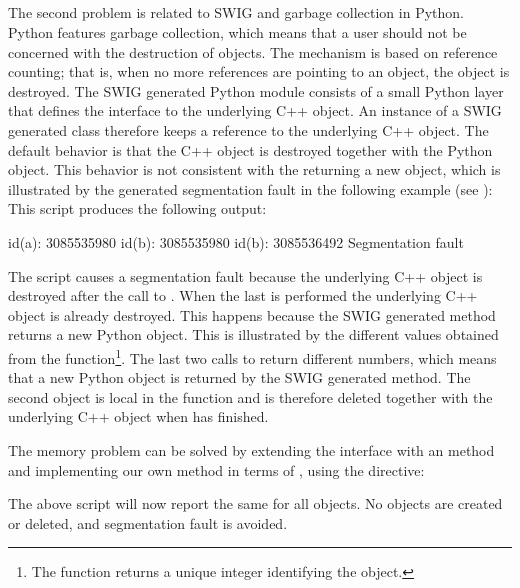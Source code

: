 \subsection{}
The second problem is related to SWIG and garbage collection in Python.
Python features garbage collection, which means that a user should not
be concerned with the destruction of objects. The mechanism is based
on reference counting; that is, when no more references are pointing
to an object, the object is destroyed. The SWIG generated Python
module consists of a small Python layer that defines the interface
to the underlying C++ object. An instance of a SWIG generated class
therefore keeps a reference to the underlying C++ object. The default
behavior is that the C++ object is destroyed together with the Python
object. This behavior is not consistent with the  returning a new object, which is illustrated by the generated
segmentation fault in the following example (see ):
 This script produces
the following output:
\begin{python}
id(a): 3085535980
id(b): 3085535980
id(b): 3085536492
Segmentation fault
\end{python}
The script causes a segmentation fault because the underlying C++ object
is destroyed after the call to . When the last  is
performed the underlying C++ object is already destroyed. This happens
because the SWIG generated  method returns a new
Python object. This is illustrated by the different values obtained from
the  function\footnote{The  function returns a unique
integer identifying the object.}. The last two calls to  return
different numbers, which means that a new Python object is returned by
the SWIG generated  method. The second  object
is local in the  function and is therefore deleted together
with the underlying C++ object when  has finished.

The memory problem can be solved by extending the interface with an
 method and implementing our own  method
in terms of , using the  directive:
The above script will now report the same  for all objects.
No objects are created or deleted, and segmentation fault is avoided.

